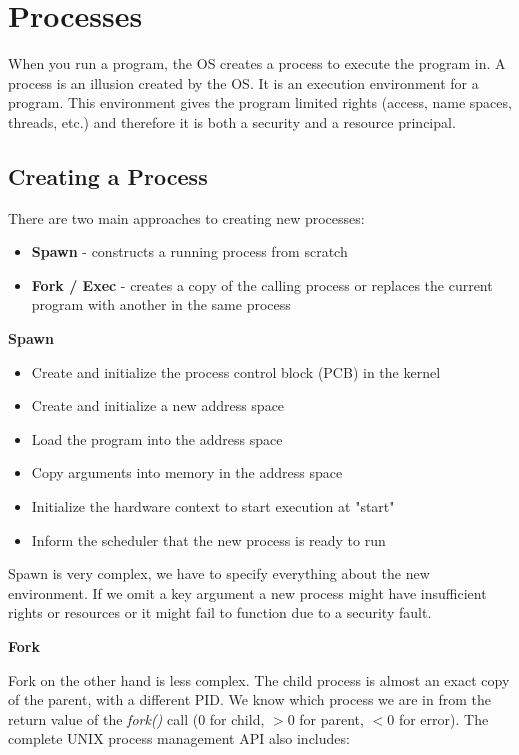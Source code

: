 \section{Processes}

When you run a program, the OS creates a process to execute the program in. A process is an illusion created by the OS. It is an execution environment for a program. This environment gives the program limited rights (access, name spaces, threads, etc.) and therefore it is both a security and a resource principal.


\subsection{Creating a Process}

There are two main approaches to creating new processes:

\begin{itemize}
	\item \textbf{Spawn} - constructs a running process from scratch
	\item \textbf{Fork / Exec} - creates a copy of the calling process or replaces the current program with another in the same process
\end{itemize}

\textbf{Spawn}

\begin{itemize}
	\item Create and initialize the process control block (PCB) in the kernel
	\item Create and initialize a new address space
	\item Load the program into the address space
	\item Copy arguments into memory in the address space
	\item Initialize the hardware context to start execution at "start"
	\item Inform the scheduler that the new process is ready to run
\end{itemize}

Spawn is very complex, we have to specify everything about the new environment. If we omit a key argument a new process might have insufficient rights or resources or it might fail to function due to a security fault. \medskip

\textbf{Fork}

Fork on the other hand is less complex. The child process is almost an exact copy of the parent, with a different PID. We know which process we are in from the return value of the \textit{fork()} call ($0$ for child, $>0$ for parent, $<0$ for error). The complete UNIX process management API also includes:

